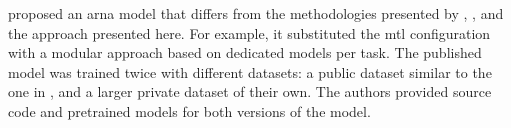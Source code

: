 
\textcite{mcleod2021modular} proposed an \gls{arna} model
that differs from the methodologies presented by
\textcite{chen2021attend}, \textcite{micchi2021deep}, and
the approach presented here. For example, it substituted the
\gls{mtl} configuration with a modular approach based on
dedicated models per task. The published model was trained
twice with different datasets: a public dataset similar to
the one in \textcite{micchi2021deep}, and a larger private
dataset of their own. The authors provided source code and
pretrained models for both versions of the model.
